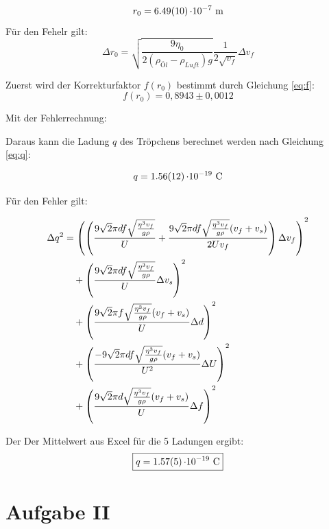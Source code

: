 \[r_0 = \SI{6,49 \pm 0,10}{\cdot 10^{-7}\ \meter} \]
Für den Fehelr gilt:
\begin{equation}
    \Delta r_0 = \sqrt{\frac{9 \eta_0}{2 (\rho_{Öl}- \rho_{Luft}) g}} \frac{1}{2 \sqrt{v_f}}\Delta v_f
\end{equation}

Zuerst wird der Korrekturfaktor $f(r_0)$ bestimmt durch Gleichung \ref{eq:f}:
\[f(r_0) = 0,8943 \pm 0,0012\]

Mit der Fehlerrechnung:

Daraus kann die Ladung $q$ des Tröpchens berechnet werden nach Gleichung \ref{eq:q}:

\[q = \SI{1,56 \pm 0.12}{\cdot 10^{-19}\ \coulomb}\]

Für den Fehler gilt:


\begin{align}
\Delta q^2 &= \left( \left(\frac{9\sqrt{2}\pi df \sqrt{\frac{\eta^{3}v_f}{g\rho}}}{U} + \frac{9\sqrt{2}\pi df \sqrt{\frac{\eta^{3}v_f}{g\rho}} (v_f+v_s)}{2U v_f}\right) \Delta v_f\right)^2 \notag\\ 
&\quad + \left(\frac{9\sqrt{2}\pi df \sqrt{\frac{\eta^{3}v_f}{g\rho}}}{U} \Delta v_s\right)^2 \notag\\
&\quad + \left(\frac{9\sqrt{2}\pi f \sqrt{\frac{\eta^{3}v_f}{g\rho}} (v_f+v_s)}{U} \Delta d\right)^2 \notag\\
&\quad + \left(\frac{-9\sqrt{2}\pi df \sqrt{\frac{\eta^{3}v_f}{g\rho}} (v_f+v_s)}{U^2} \Delta U\right)^2 \notag\\
&\quad + \left(\frac{9\sqrt{2}\pi d \sqrt{\frac{\eta^{3}v_f}{g\rho}} (v_f+v_s)}{U} \Delta f\right)^2
\end{align}

Der Der Mittelwert aus Excel für die 5 Ladungen ergibt:
\[\boxed{q = \SI{1,57 \pm0,05}{\cdot 10^{-19}\ \coulomb}}\]

\newpage
\section{Aufgabe II}

